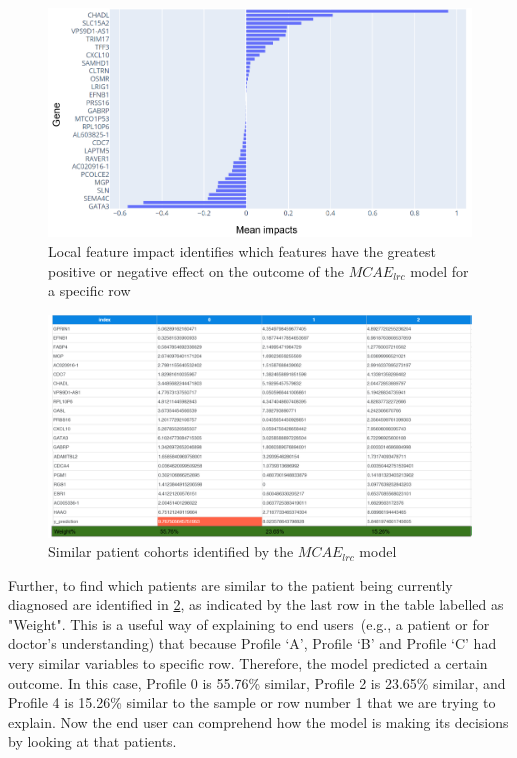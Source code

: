 \begin{figure}[h]
    \centering
	\includegraphics[scale=1.2]{images/local_fi_1.png}
	\caption{Local feature impact identifies which features have the greatest positive or negative effect on the outcome of the $MCAE_{lrc}$ model for a specific row}
    \label{fig:local_feature_impacts}
\end{figure}

\begin{figure}[h]
    \centering
	\includegraphics[scale=0.65]{images/similar_profiles.png}
	\caption{Similar patient cohorts identified by the $MCAE_{lrc}$ model}
    \label{fig:similar_patients}
\end{figure}


\hspace*{3.5mm} Further, to find which patients are similar to the patient being currently diagnosed are identified in \cref{fig:similar_patients}, as indicated by the last row in the table labelled as "Weight". This is a useful way of explaining to end users~(e.g., a patient or for doctor's understanding) that because Profile `A', Profile `B' and Profile `C' had very similar variables to specific row. Therefore, the model predicted a certain outcome. In this case, Profile 0 is 55.76\% similar, Profile 2 is 23.65\% similar, and Profile 4 is 15.26\% similar to the sample or row number 1 that we are trying to explain. Now the end user can comprehend how the model is making its decisions by looking at that patients.  

